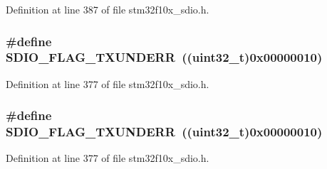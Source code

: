 Definition at line 387 of file stm32f10x\+\_\+sdio.\+h.

\subsubsection[{\texorpdfstring{S\+D\+I\+O\+\_\+\+F\+L\+A\+G\+\_\+\+T\+X\+U\+N\+D\+E\+RR}{SDIO_FLAG_TXUNDERR}}]{\setlength{\rightskip}{0pt plus 5cm}\#define S\+D\+I\+O\+\_\+\+F\+L\+A\+G\+\_\+\+T\+X\+U\+N\+D\+E\+RR~(({\bf uint32\+\_\+t})0x00000010)}\hypertarget{group___s_d_i_o___flags_gabd18f8e5d5387a38dccbe1bf28ae5dbc}{}\label{group___s_d_i_o___flags_gabd18f8e5d5387a38dccbe1bf28ae5dbc}


Definition at line 377 of file stm32f10x\+\_\+sdio.\+h.

\subsubsection[{\texorpdfstring{S\+D\+I\+O\+\_\+\+F\+L\+A\+G\+\_\+\+T\+X\+U\+N\+D\+E\+RR}{SDIO_FLAG_TXUNDERR}}]{\setlength{\rightskip}{0pt plus 5cm}\#define S\+D\+I\+O\+\_\+\+F\+L\+A\+G\+\_\+\+T\+X\+U\+N\+D\+E\+RR~(({\bf uint32\+\_\+t})0x00000010)}\hypertarget{group___s_d_i_o___flags_gabd18f8e5d5387a38dccbe1bf28ae5dbc}{}\label{group___s_d_i_o___flags_gabd18f8e5d5387a38dccbe1bf28ae5dbc}


Definition at line 377 of file stm32f10x\+\_\+sdio.\+h.

